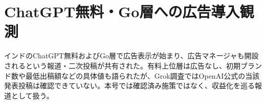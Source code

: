 \section{ChatGPT無料・Go層への広告導入観測}
インドのChatGPT無料およびGo層で広告表示が始まり、広告マネージャも開設されるという報道・二次投稿が共有された。有料上位層は広告なし、初期ブランド数や最低出稿額などの具体値も語られたが、Grok調査ではOpenAI公式の当該発表投稿は確認できていない。本号では確認済み施策ではなく、収益化を巡る報道として扱う。

